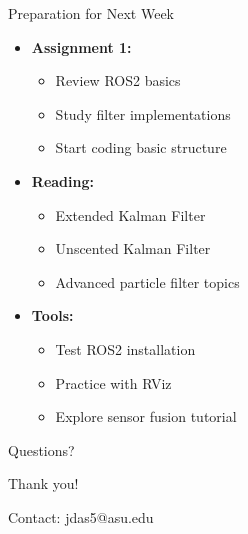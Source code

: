 \documentclass[aspectratio=169]{beamer}
\begin{document}
\begin{frame}{Preparation for Next Week}
    \begin{itemize}
        \item<1-> \textbf{Assignment 1:}
            \begin{itemize}
                \item Review ROS2 basics
                \item Study filter implementations
                \item Start coding basic structure
            \end{itemize}
        \item<2-> \textbf{Reading:}
            \begin{itemize}
                \item Extended Kalman Filter
                \item Unscented Kalman Filter
                \item Advanced particle filter topics
            \end{itemize}
        \item<3-> \textbf{Tools:}
            \begin{itemize}
                \item Test ROS2 installation
                \item Practice with RViz
                \item Explore sensor fusion tutorial
            \end{itemize}
    \end{itemize}
\end{frame}

\begin{frame}{Questions?}
    \begin{center}
        \Huge Thank you!
        
        \vspace{1cm}
        \normalsize
        Contact: jdas5@asu.edu
    \end{center}
\end{frame}
\end{document}
